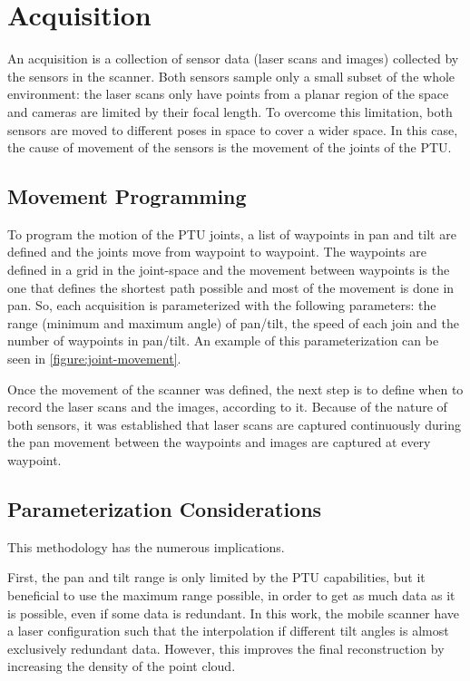 \section{Acquisition}
\label{section:acquisition}

An acquisition is a collection of sensor data (laser scans and images) collected by the sensors in the scanner. Both sensors sample only a small subset of the whole environment: the laser scans only have points from a planar region of the space and cameras are limited by their focal length. To overcome this limitation, both sensors are moved to different poses in space to cover a wider space. In this case, the cause of movement of the sensors is the movement of the joints of the PTU. 

\subsection{Movement Programming}

To program the motion of the PTU joints, a list of waypoints in pan and tilt are defined and the joints move from waypoint to waypoint. The waypoints are defined in a grid in the joint-space and the movement between waypoints is the one that defines the shortest path possible and most of the movement is done in pan. So, each acquisition is parameterized with the following parameters: the range (minimum and maximum angle) of pan/tilt, the speed of each join and the number of waypoints in pan/tilt. An example of this parameterization can be seen in \cref{figure:joint-movement}.

Once the movement of the scanner was defined, the next step is to define when to record the laser scans and the images, according to it. Because of the nature of both sensors, it was established that laser scans are captured continuously during the pan movement between the waypoints and images are captured at every waypoint.



\subsection{Parameterization Considerations}

This methodology has the numerous implications.
        
First, the pan and tilt range is only limited by the PTU capabilities, but it beneficial to use the maximum range possible, in order to get as much data as it is possible, even if some data is redundant. In this work, the mobile scanner have a laser configuration such that the interpolation if different tilt angles is almost exclusively redundant data. However, this improves the final reconstruction by increasing the density of the point cloud.
                    
